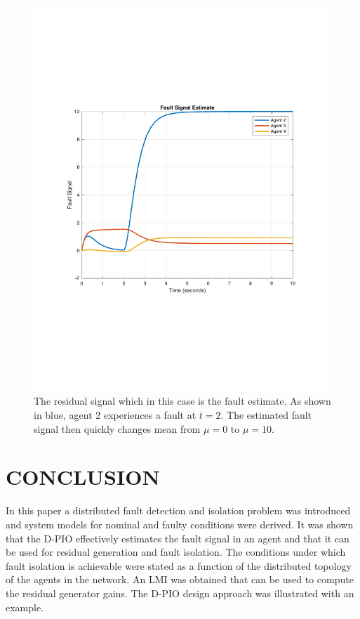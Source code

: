 \documentclass[letterpaper, 11 pt, conference]{ieeeconf}  %
\begin{document}
\begin{figure}
    \centering
    \includegraphics[scale=0.5]{images/faultEstimate.pdf}
    \caption{The residual signal which in this case is the fault estimate. As shown in blue, agent 2 experiences a fault at $t=2$. The estimated fault signal then quickly changes mean from $\mu = 0$ to $\mu = 10$.}
    \label{fig:D_PIO_2}
\end{figure}

\section{CONCLUSION} \label{sec:con}
In this paper a distributed fault detection and isolation problem was introduced and system models for nominal and faulty conditions were derived. It was shown that the D-PIO effectively estimates the fault signal in an agent and that it can be used for residual generation and fault isolation. The conditions under which fault isolation is achievable were stated as a function of the distributed topology of the agents in the network. An LMI was obtained that can be used to compute the residual generator gains. The D-PIO design approach was illustrated with an example. 
\end{document}
